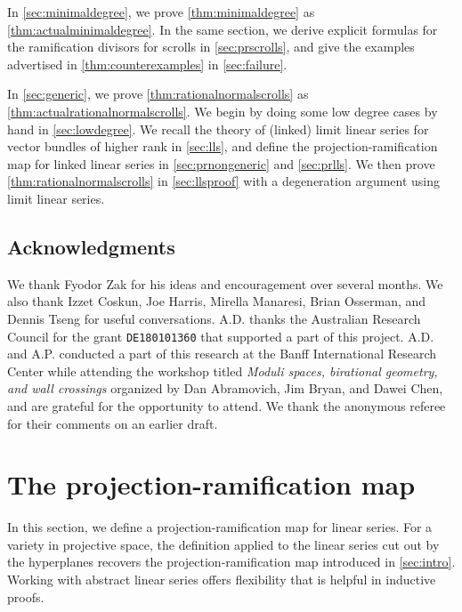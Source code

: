In \autoref{sec:minimaldegree}, we prove \autoref{thm:minimaldegree} as \autoref{thm:actualminimaldegree}.
In the same section, we derive explicit formulas for the ramification divisors for scrolls in \autoref{sec:prscrolls}, and give the examples advertised in \autoref{thm:counterexamples} in \autoref{sec:failure}.%

In \autoref{sec:generic}, we prove \autoref{thm:rationalnormalscrolls} as \autoref{thm:actualrationalnormalscrolls}.
We begin by doing some low degree cases by hand in \autoref{sec:lowdegree}.
We recall the theory of (linked) limit linear series for vector bundles of higher rank in \autoref{sec:lls}, and define the projection-ramification map for linked linear series in \autoref{sec:prnongeneric} and \autoref{sec:prlls}.
We then prove \autoref{thm:rationalnormalscrolls} in \autoref{sec:llsproof} with a degeneration argument using limit linear series.


\subsection*{Acknowledgments}
We thank Fyodor Zak for his ideas and encouragement over several months.
We also thank Izzet Coskun, Joe Harris, Mirella Manaresi, Brian Osserman, and Dennis Tseng for useful conversations. 
A.D. thanks the Australian Research Council for the grant \texttt{DE180101360} that supported a part of this project.
A.D. and A.P. conducted a part of this research at the Banff International Research Center while attending the workshop titled \emph{Moduli spaces, birational geometry, and wall crossings} organized by Dan Abramovich, Jim Bryan, and Dawei Chen, and are grateful for the opportunity to attend.
We thank the anonymous referee for their comments on an earlier draft.

\section{The projection-ramification map}\label{sec:prmap}
In this section, we define a projection-ramification map for linear series.
For a variety in projective space, the definition applied to the linear series cut out by the hyperplanes recovers the projection-ramification map introduced in \autoref{sec:intro}.
Working with abstract linear series offers flexibility that is helpful in inductive proofs.

